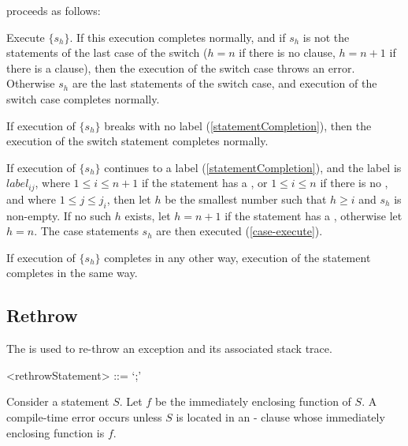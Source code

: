 \documentclass[makeidx]{article}
\begin{document}
{\noindent
proceeds as follows:

\LMHash{}%
Execute $\{s_h\}$.
If this execution completes normally,
and if $s_h$ is not the statements of the last case of the switch
($h = n$ if there is no \DEFAULT{} clause,
$h = n+1$ if there is a \DEFAULT{} clause),
then the execution of the switch case throws an error.
Otherwise $s_h$ are the last statements of the switch case,
and execution of the switch case completes normally.


If execution of $\{s_h\}$ breaks with no label (\ref{statementCompletion}),
then the execution of the switch statement completes normally.

If execution of $\{s_h\}$ continues to a label
(\ref{statementCompletion}),
and the label is $label_{ij}$,
where $1 \le i \le n+1$ if the \SWITCH{} statement has a \DEFAULT,
or $1 \le i \le n$ if there is no \DEFAULT,
and where $1 \le j \le j_{i}$,
then let $h$ be the smallest number such that $h \ge i$ and $s_h$ is non-empty.
If no such $h$ exists,
let $h = n + 1$ if the \SWITCH{} statement has a \DEFAULT,
otherwise let $h = n$.
The case statements $s_h$ are then executed (\ref{case-execute}).

If execution of $\{s_h\}$ completes in any other way,
execution of the \SWITCH{} statement completes in the same way.


\subsection{Rethrow}

\LMHash{}%
The  is used to
re-throw an exception and its associated stack trace.

\begin{grammar}
<rethrowStatement> ::= \RETHROW{} `;'
\end{grammar}

\LMHash{}%
Consider a \RETHROW{} statement $S$.
Let $f$ be the immediately enclosing function of $S$.
A compile-time error occurs unless $S$ is located in an \ON-\CATCH{} clause
whose immediately enclosing function is $f$.

}
\end{document}
